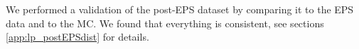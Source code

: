 We performed a validation of the post-EPS dataset by comparing it to the EPS data and to the MC. 
We found that everything is consistent, see sections \ref{app:lp_postEPSdist} for details.


